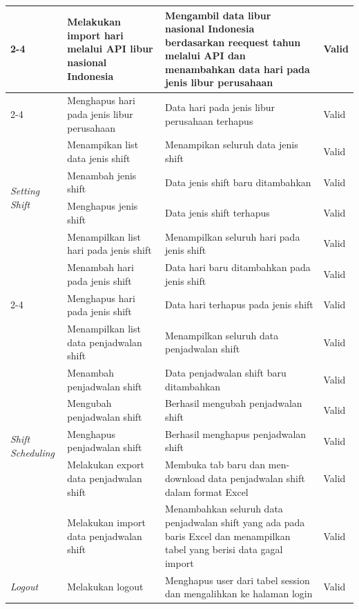 \begin{longtable}{ |p{3cm}|p{4cm}|p{4cm}|p{2cm}|}
\cline{2-4}
&Melakukan import hari melalui API libur nasional Indonesia
&Mengambil data libur nasional Indonesia berdasarkan reequest tahun melalui API dan menambahkan data hari pada jenis libur perusahaan
&Valid
\\

\cline{2-4}
&Menghapus hari pada jenis libur perusahaan
&Data hari pada jenis libur perusahaan terhapus
&Valid
\\
\hline

\multirow{4}{*}{\textit{Setting Shift}}
&Menampikan list data jenis shift
&Menampikan seluruh data jenis shift
&Valid
\\

\cline{2-4}
&Menambah jenis shift
&Data jenis shift baru ditambahkan
&Valid
\\

\cline{2-4}
&Menghapus jenis shift
&Data jenis shift terhapus
&Valid
\\

\cline{2-4}
&Menampilkan list hari pada jenis shift
&Menampilkan seluruh hari pada jenis shift
&Valid
\\
\hline
\vspace{1cm}
\multirow{2}{*}{}
&Menambah hari pada jenis shift
&Data hari baru ditambahkan pada jenis shift
&Valid
\\

\cline{2-4}
&Menghapus hari pada jenis shift
&Data hari terhapus pada jenis shift
&Valid
\\
\hline

\multirow{6}{*}{\textit{Shift Scheduling}}
&Menampilkan list data penjadwalan shift
&Menampilkan seluruh data penjadwalan shift
&Valid
\\

\cline{2-4}
&Menambah penjadwalan shift
&Data penjadwalan shift baru ditambahkan
&Valid
\\

\cline{2-4}
&Mengubah penjadwalan shift
&Berhasil mengubah penjadwalan shift
&Valid
\\

\cline{2-4}
&Menghapus penjadwalan shift
&Berhasil menghapus penjadwalan shift
&Valid
\\

\cline{2-4}
&Melakukan export data penjadwalan shift
&Membuka tab baru dan men-download data penjadwalan shift dalam format Excel
&Valid
\\

\cline{2-4}
&Melakukan import data penjadwalan shift
&Menambahkan seluruh data penjadwalan shift yang ada pada baris Excel dan menampilkan tabel yang berisi data gagal import
&Valid
\\
\hline

\multirow{1}{*}{\textit{Logout}}
&Melakukan logout
&Menghapus user dari tabel session dan mengalihkan ke halaman login
&Valid
\\
\hline

\end{longtable}
